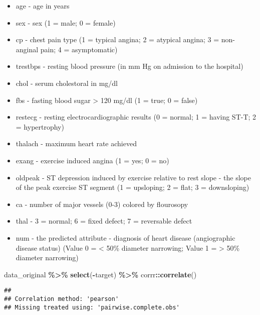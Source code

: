 \documentclass[
]{book}
\newenvironment{Shaded}{\begin{snugshade}}{\end{snugshade}}
\newcommand{\KeywordTok}[1]{\textcolor[rgb]{0.13,0.29,0.53}{\textbf{#1}}}
\newcommand{\NormalTok}[1]{#1}
\newcommand{\OperatorTok}[1]{\textcolor[rgb]{0.81,0.36,0.00}{\textbf{#1}}}
\newcommand{\StringTok}[1]{\textcolor[rgb]{0.31,0.60,0.02}{#1}}
\providecommand{\tightlist}{%
  \setlength{\itemsep}{0pt}\setlength{\parskip}{0pt}}
\begin{document}
\begin{itemize}
\tightlist
\item
  age - age in years
\item
  sex - sex (1 = male; 0 = female)
\item
  cp - chest pain type (1 = typical angina; 2 = atypical angina; 3 = non-anginal pain; 4 = asymptomatic)
\item
  trestbps - resting blood pressure (in mm Hg on admission to the hospital)
\item
  chol - serum cholestoral in mg/dl
\item
  fbs - fasting blood sugar \textgreater{} 120 mg/dl (1 = true; 0 = false)
\item
  restecg - resting electrocardiographic results (0 = normal; 1 = having ST-T; 2 = hypertrophy)
\item
  thalach - maximum heart rate achieved
\item
  exang - exercise induced angina (1 = yes; 0 = no)
\item
  oldpeak - ST depression induced by exercise relative to rest
  slope - the slope of the peak exercise ST segment (1 = upsloping; 2 = flat; 3 = downsloping)
\item
  ca - number of major vessels (0-3) colored by flourosopy
\item
  thal - 3 = normal; 6 = fixed defect; 7 = reversable defect
\item
  num - the predicted attribute - diagnosis of heart disease (angiographic disease status) (Value 0 = \textless{} 50\% diameter narrowing; Value 1 = \textgreater{} 50\% diameter narrowing)
\end{itemize}

\begin{Shaded}
\begin{Highlighting}[]
\NormalTok{data\_original }\OperatorTok{\%\textgreater{}\%}
\StringTok{  }\KeywordTok{select}\NormalTok{(}\OperatorTok{{-}}\NormalTok{target) }\OperatorTok{\%\textgreater{}\%}
\StringTok{  }\NormalTok{corrr}\OperatorTok{::}\KeywordTok{correlate}\NormalTok{()}
\end{Highlighting}
\end{Shaded}

\begin{verbatim}
## 
## Correlation method: 'pearson'
## Missing treated using: 'pairwise.complete.obs'
\end{verbatim}
\end{document}
